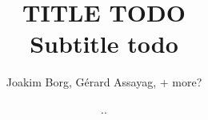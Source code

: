 \documentclass[10pt]{article}        %
\title{TITLE TODO\\[0.24cm]
	\large{Subtitle todo}}
\author{Joakim Borg, Gérard Assayag, + more?}
\date{..}
\begin{document}
\maketitle











{}

\end{document}

